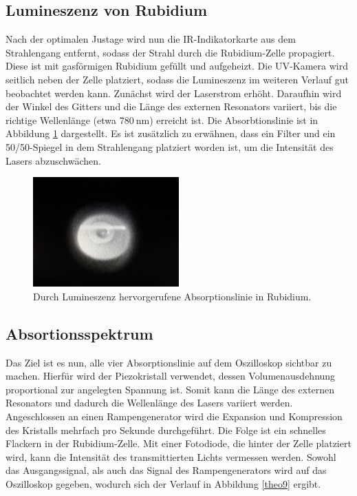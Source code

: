 \subsection{Lumineszenz von Rubidium}
Nach der optimalen Justage wird nun die IR-Indikatorkarte aus dem Strahlengang entfernt, sodass der Strahl durch die Rubidium-Zelle propagiert. Diese ist mit gasförmigen Rubidium gefüllt und aufgeheizt. Die UV-Kamera wird seitlich neben der Zelle platziert, sodass die Lumineszenz im weiteren Verlauf gut beobachtet werden kann. Zunächst wird der Laserstrom erhöht. Daraufhin wird der Winkel des Gitters und die Länge des externen Resonators variiert, bis die richtige Wellenlänge (etwa 780$\:$nm) erreicht ist. Die Absorbtionslinie ist in Abbildung \ref{theo8} dargestellt. Es ist zusätzlich zu erwähnen, dass ein Filter und ein 50/50-Spiegel in dem Strahlengang platziert worden ist, um die Intensität des Lasers abzuschwächen.   

\begin{figure}[H]
\centering
\includegraphics[width=0.5\textwidth]{ressources/Absorption.jpg}
\caption{Durch Lumineszenz hervorgerufene Absorptionslinie in Rubidium.}
\label{theo8}
\end{figure}


\subsection{Absortionsspektrum}
Das Ziel ist es nun, alle vier Absorptionslinie auf dem Oszilloskop sichtbar zu machen. Hierfür wird der Piezokristall verwendet, dessen Volumenausdehnung proportional zur angelegten Spannung ist. Somit kann die Länge des externen Resonators und dadurch die Wellenlänge des Lasers variiert werden. Angeschlossen an einen Rampengenerator wird die Expansion und Kompression des Kristalls mehrfach pro Sekunde durchgeführt. Die Folge ist ein schnelles Flackern in der Rubidium-Zelle. Mit einer Fotodiode, die hinter der Zelle platziert wird, kann die Intensität des transmittierten Lichts vermessen werden. Sowohl das Ausgangssignal, als auch das Signal des Rampengenerators wird auf das Oszilloskop gegeben, wodurch sich der Verlauf in Abbildung \ref{theo9} ergibt.

